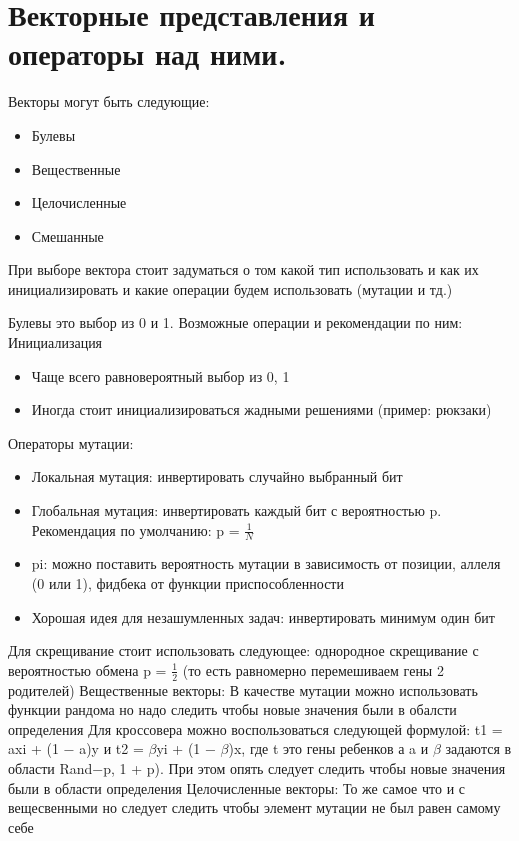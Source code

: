 \section{Векторные представления и операторы над ними.}
Векторы могут быть следующие: 
\begin{itemize}
\item Булевы
\item Вещественные
\item Целочисленные
\item Смешанные
\end{itemize}
При выборе вектора стоит задуматься о том какой тип использовать и как их инициализировать и какие операции будем использовать (мутации и тд.)

Булевы это выбор из 0 и 1. 
Возможные операции и рекомендации по ним:
Инициализация
\begin{itemize}
\item Чаще всего равновероятный выбор из {0, 1}
\item Иногда стоит инициализироваться жадными решениями (пример: рюкзаки)
\end{itemize}
Операторы мутации:
\begin{itemize}
\item Локальная мутация: инвертировать случайно выбранный бит
\item Глобальная мутация: инвертировать каждый бит с вероятностью p. Рекомендация по умолчанию: p = $\frac{1}{N}$
\item pi: можно поставить вероятность мутации в зависимость от позиции, аллеля (0 или 1), фидбека от функции приспособленности
\item Хорошая идея для незашумленных задач: инвертировать минимум один бит
\end{itemize}
Для скрещивание стоит использовать следующее: однородное скрещивание с вероятностью обмена p = $\frac{1}{2}$ (то есть равномерно перемешиваем гены 2 родителей)
Вещественные векторы:
В качестве мутации можно использовать функции рандома но надо следить чтобы новые значения были в обалсти определения
Для кроссовера можно воспользоваться следующей формулой: t1 = axi + (1 − a)y и t2 = $\beta$yi + (1 − $\beta$)x, где t это гены ребенков а a и $\beta$ задаются в области Rand−p, 1 + p). При этом опять следует следить чтобы новые значения были в области определения
Целочисленные векторы:
То же самое что и с вещесвенными но следует следить чтобы элемент мутации не был равен самому себе
